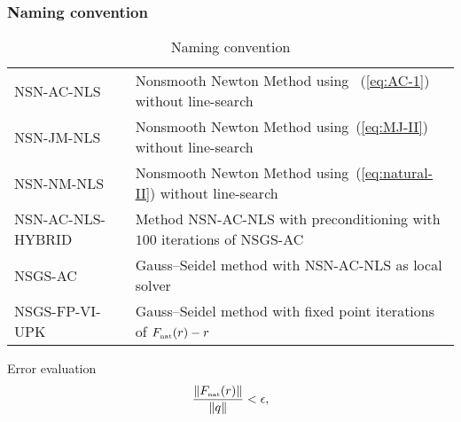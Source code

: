 \begin{frame}
  \frametitle{Naming convention}
  \begin{table}
  \centering
  \begin{tabular}{lp{}}
    \hline
    {\sf\small NSN-AC-NLS} & Nonsmooth Newton Method using ~(\ref{eq:AC-1}) without line-search \\
    {\sf\small NSN-JM-NLS} & Nonsmooth Newton Method using~(\ref{eq:MJ-II}) without line-search \\
    {\sf\small NSN-NM-NLS} & Nonsmooth Newton Method using~(\ref{eq:natural-II}) without line-search\\
    {\sf\small NSN-AC-NLS-HYBRID} &Method {\sf\small NSN-AC-NLS} with preconditioning with  $100$ iterations of  {\sf\small NSGS-AC} \\
    {\sf\small NSGS-AC} & Gauss--Seidel method with {\sf\small NSN-AC-NLS} as local solver\\
    {\sf\small  NSGS-FP-VI-UPK} & Gauss--Seidel method with fixed point iterations of  $F_{\hbox{\tiny{nat}}}(r)-r$\\
    \hline 
  \end{tabular}
  \caption{Naming convention}
  \label{tab:nomenclature}
\end{table}

\begin{block}{Error evaluation}
  \begin{equation}
    \label{eq:stopping-criteria-full}
    \displaystyle\frac{\|F_{\hbox{\tiny{nat}}}(r)\|}{\|q\|} < \epsilon,
  \end{equation}
\end{block}

\end{frame}




